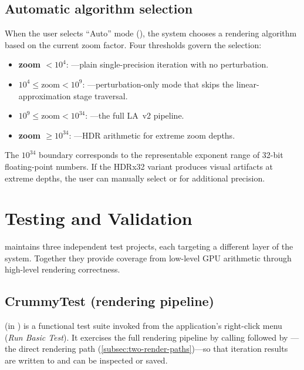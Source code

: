 \subsection{Automatic algorithm selection}
\label{subsec:auto-algorithm}

When the user selects ``Auto'' mode
(), the system chooses a rendering
algorithm based on the current zoom factor.  Four thresholds govern the
selection:
\begin{itemize}
  \item \textbf{zoom $< 10^{4}$}: ---plain
        single-precision iteration with no perturbation.
  \item \textbf{$10^{4} \le \text{zoom} < 10^{9}$}:
        ---perturbation-only mode that
        skips the linear-approximation stage traversal.
  \item \textbf{$10^{9} \le \text{zoom} < 10^{34}$}:
        ---the full LA~v2 pipeline.
  \item \textbf{zoom $\ge 10^{34}$}:
        ---HDR arithmetic for extreme
        zoom depths.
\end{itemize}
The $10^{34}$ boundary corresponds to the representable exponent range
of 32-bit floating-point numbers.  If the HDRx32 variant produces
visual artifacts at extreme depths, the user can manually select
 or  for additional precision.

\section{Testing and Validation}
\label{sec:testing}

\FractalShark{} maintains three independent test projects, each
targeting a different layer of the system.  Together they provide
coverage from low-level GPU arithmetic through high-level rendering
correctness.

\subsection{CrummyTest (rendering pipeline)}
\label{subsec:crummytest}

 (in ) is a
functional test suite invoked from the application's right-click menu
(\emph{Run Basic Test}).  It exercises the full rendering pipeline by
calling  followed by ---the
direct rendering path (\cref{subsec:two-render-paths})---so that
iteration results are written to  and can be
inspected or saved.

